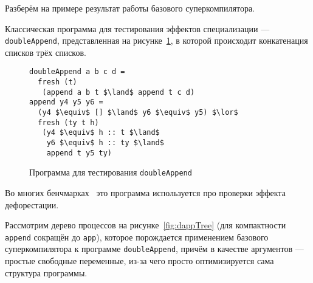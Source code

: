 

Разберём на примере результат работы базового суперкомпилятора.

Классическая программа для тестирования эффектов специализации ---
\lstinline{doubleAppend}, представленная на рисунке~\ref{fig:dappCode},
в которой происходит конкатенация списков трёх списков.

\begin{figure}[h!]
\begin{lstlisting}
doubleAppend a b c d =
  fresh (t)
   (append a b t $\land$ append t c d)
append y4 y5 y6 =
  (y4 $\equiv$ [] $\land$ y6 $\equiv$ y5) $\lor$
  fresh (ty t h)
   (y4 $\equiv$ h :: t $\land$
    y6 $\equiv$ h :: ty $\land$
    append t y5 ty)
\end{lstlisting}
\caption{Программа для тестирования \lstinline{doubleAppend}}
\label{fig:dappCode}
\end{figure}

Во многих бенчмарках~\cite{cpdPract, controlPoly} это программа используется
про проверки эффекта дефорестации.

Рассмотрим дерево процессов на рисунке~\ref{fig:dappTree}
(для компактности \lstinline{append} сокращён до \lstinline{app}),
которое порождается применением базового
суперкомпилятора к программе \lstinline{doubleAppend}, причём в
качестве аргументов --- простые свободные переменные, из-за чего
просто оптимизируется сама структура программы.

